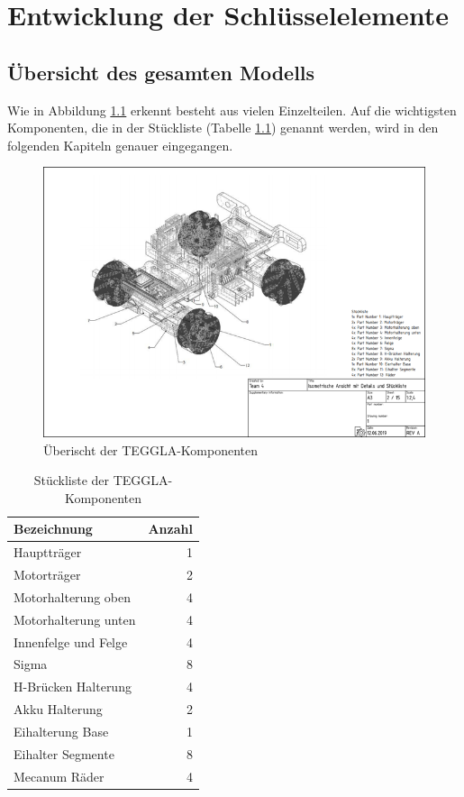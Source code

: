 \chapter{Entwicklung der Schlüsselelemente}
\section{Übersicht des gesamten Modells}
Wie in Abbildung \ref{bild:tegglaoverview} erkennt besteht aus vielen Einzelteilen. 
Auf die wichtigsten Komponenten, die in der Stückliste (Tabelle \ref{table:tegglaoverview}) genannt werden, wird in den folgenden Kapiteln genauer eingegangen.
\begin{figure}[!ht]
	\centering
	\includegraphics[width=\textwidth]{bilder/overview.png}
	\caption{Überischt der TEGGLA-Komponenten}
	\label{bild:tegglaoverview}
\end{figure}

\begin{table}[!ht]
\centering
\begin{tabular}{lr}
	Bezeichnung & Anzahl \\ 
	\midrule[3pt] 
	Hauptträger            & 1 \\ \midrule
	Motorträger            & 2 \\ \midrule
	Motorhalterung oben    & 4 \\ \midrule
	Motorhalterung unten   & 4 \\ \midrule
	Innenfelge und Felge   & 4 \\ \midrule
	Sigma                  & 8 \\ \midrule
	H-Brücken Halterung    & 4 \\ \midrule
	Akku Halterung         & 2 \\ \midrule
	Eihalterung Base       & 1 \\ \midrule
	Eihalter Segmente      & 8 \\ \midrule
	Mecanum Räder          & 4
\end{tabular} 
\caption{Stückliste der TEGGLA-Komponenten} 
\label{table:tegglaoverview}
\end{table} 



